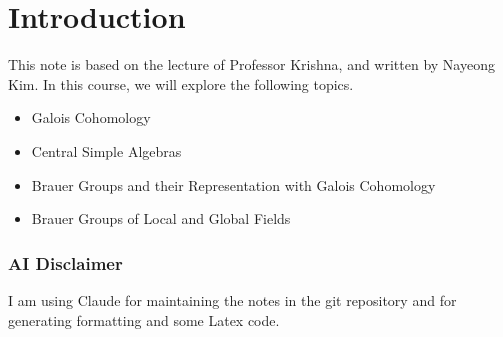 \section*{Introduction}
This note is based on the lecture of Professor Krishna,
and written by Nayeong Kim.
In this course,
we will explore the following topics.
\begin{itemize}
    \item Galois Cohomology
    \item Central Simple Algebras
    \item Brauer Groups and their Representation with Galois Cohomology
    \item Brauer Groups of Local and Global Fields
\end{itemize}


\subsubsection*{AI Disclaimer}
I am using Claude for maintaining the notes in the git repository
and for generating formatting and some Latex code.

\newpage